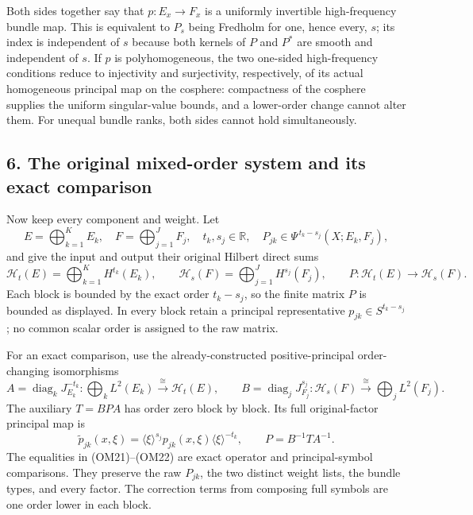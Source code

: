 \documentclass[
  11pt,
]{article}
\makeatletter
\let\ReaderOriginalAnchorStart\hyper@anchorstart
\let\ReaderOriginalAnchorEnd\hyper@anchorend
\let\ReaderPendingAliases\@empty
\def\ReaderArmAliases#1{\gdef\ReaderPendingAliases{#1}}
\def\hyper@anchorstart#1{\ReaderIfNativeAnchorTF{#1}{\ReaderPendingAliases\global\let\ReaderPendingAliases\@empty}{}\ReaderOriginalAnchorStart{#1}}
\makeatother
\begin{document}
Both sides together say that \(p:E_x\to F_x\) is a uniformly invertible
high-frequency bundle map. This is equivalent to \(P_s\) being Fredholm
for one, hence every, \(s\); its index is independent of \(s\) because
both kernels of \(P\) and \(P^*\) are smooth and independent of \(s\).
If \(p\) is polyhomogeneous, the two one-sided high-frequency conditions
reduce to injectivity and surjectivity, respectively, of its actual
homogeneous principal map on the cosphere: compactness of the cosphere
supplies the uniform singular-value bounds, and a lower-order change
cannot alter them. For unequal bundle ranks, both sides cannot hold
simultaneously.

\ReaderArmAliases{\ReaderOriginalAnchorStart{AN03-OMF-006}\ReaderOriginalAnchorEnd\begingroup\expandafter\def\csname @currentHref\endcsname{AN03-OMF-006}\label{AN03-OMF-006}\endgroup\ReaderOriginalAnchorStart{6-the-original-mixed-order-system-and-its-exact-comparison}\ReaderOriginalAnchorEnd\begingroup\expandafter\def\csname @currentHref\endcsname{6-the-original-mixed-order-system-and-its-exact-comparison}\label{6-the-original-mixed-order-system-and-its-exact-comparison}\endgroup}
\subsection{6. The original mixed-order system and its exact
comparison}\label{the-original-mixed-order-system-and-its-exact-comparison}

Now keep every component and weight. Let \[
 E=\bigoplus_{k=1}^K E_k,\quad F=\bigoplus_{j=1}^J F_j,\quad
 t_k,s_j\in\mathbb R,\quad
 P_{jk}\in\Psi^{\,t_k-s_j}(X;E_k,F_j),
 \tag{OM19}
\] and give the input and output their original Hilbert direct sums \[
 \mathcal H_t(E)=\bigoplus_{k=1}^K H^{t_k}(E_k),\qquad
 \mathcal H_s(F)=\bigoplus_{j=1}^J H^{s_j}(F_j),\qquad
 P:\mathcal H_t(E)\longrightarrow\mathcal H_s(F).
 \tag{OM20}
\] Each block is bounded by the exact order \(t_k-s_j\), so the finite
matrix \(P\) is bounded as displayed. In every block retain a principal
representative \(p_{jk}\in S^{t_k-s_j}\); no common scalar order is
assigned to the raw matrix.

For an exact comparison, use the already-constructed positive-principal
order-changing isomorphisms \[
 A=\operatorname{diag}_k J_{E_k}^{-t_k}:
       \bigoplus_k L^2(E_k)\xrightarrow{\cong}\mathcal H_t(E),\qquad
 B=\operatorname{diag}_j J_{F_j}^{s_j}:
       \mathcal H_s(F)\xrightarrow{\cong}\bigoplus_jL^2(F_j).
 \tag{OM21}
\] The auxiliary \(T=BPA\) has order zero block by block. Its full
original-factor principal map is \[
 \widetilde p_{jk}(x,\xi)
   =\langle\xi\rangle^{s_j}p_{jk}(x,\xi)
       \langle\xi\rangle^{-t_k},
 \qquad
 P=B^{-1}TA^{-1}.
 \tag{OM22}
\] The equalities in (OM21)--(OM22) are exact operator and
principal-symbol comparisons. They preserve the raw \(P_{jk}\), the two
distinct weight lists, the bundle types, and every factor. The
correction terms from composing full symbols are one order lower in each
block.
\end{document}

